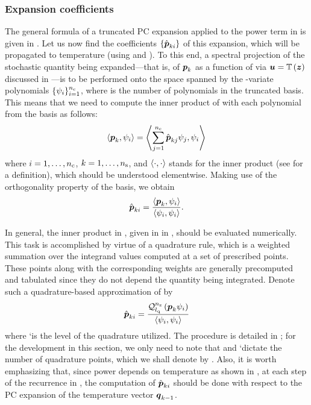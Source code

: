 \subsubsection{Expansion coefficients}

The general formula of a truncated PC expansion applied to the power term in
 is given in . Let us now find the
coefficients $\{ \hat{\boldsymbol{p}}_{ki} \}$ of this expansion, which will be propagated
to temperature (using  and ). To this
end, a spectral projection of the stochastic quantity being expanded---that is,
of $\boldsymbol{p}_k$ as a function of \vz via $\boldsymbol{u} = \mathbb{T}\left(\boldsymbol{z}\right)$ discussed in
---is to be performed onto the space spanned by the
\nz-variate polynomials $\{ \psi_i \}_{i = 1}^{{n_\mathrm{c}}}$, where \nc is the number of
polynomials in the truncated basis. This means that we need to compute the inner
product of  with each polynomial from the basis as follows:
\[
  \left\langle \boldsymbol{p}_k, \psi_i \right\rangle = \left\langle \sum_{j = 1}^{{n_\mathrm{c}}} \hat{\boldsymbol{p}}_{kj} \psi_j, \psi_i \right\rangle
\]
where $i = 1, \dots, {n_\mathrm{c}}$, $k = 1, \dots, {n_\mathrm{s}}$, and
$\left\langle \cdot, \cdot \right\rangle$ stands for the inner product (see
 for a definition), which should be understood
elementwise. Making use of the orthogonality property of the basis, we obtain
\begin{equation} \elab{pc-coefficients}
  \hat{\vp}_{ki} = \frac{\innerproduct{\vp_k}{\psi_i}}{\innerproduct{\psi_i}{\psi_i}}.
\end{equation}

In general, the inner product in , given in
 in , should be evaluated
numerically. This task is accomplished by virtue of a quadrature rule, which is
a weighted summation over the integrand values computed at a set of prescribed
points. These points along with the corresponding weights are generally
precomputed and tabulated since they do not depend the quantity being
integrated. Denote such a quadrature-based approximation of
 by
\begin{equation} \elab{pc-coefficients-quadrature}
  \hat{\vp}_{ki} = \frac{\quadrature{\nz}{\lq}{\vp_k \psi_i}}{\innerproduct{\psi_i}{\psi_i}}
\end{equation}
where \lq is the level of the quadrature utilized. The procedure is
detailed in ; for the development in this section, we
only need to note that \nz and \lq dictate the number of quadrature points,
which we shall denote by \nq. Also, it is worth emphasizing that, since power
depends on temperature as shown in , at each step of the
recurrence in , the computation of $\hat{\boldsymbol{p}}_{ki}$ should
be done with respect to the PC expansion of the temperature vector $\boldsymbol{q}_{k -
1}$.

